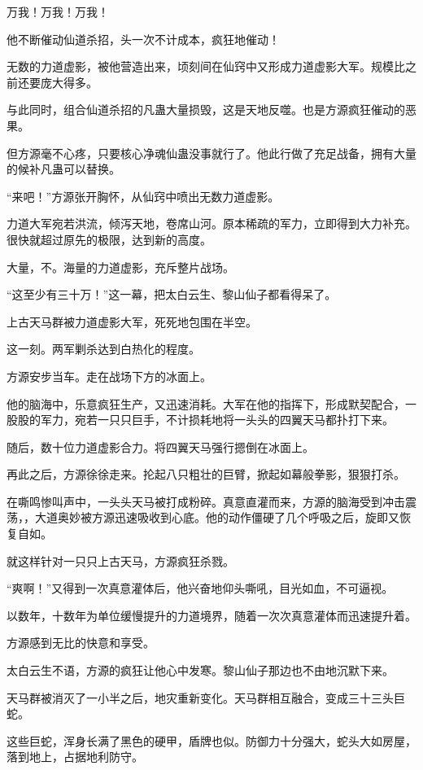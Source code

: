 \begin{this_body}
万我！万我！万我！

他不断催动仙道杀招，头一次不计成本，疯狂地催动！

无数的力道虚影，被他营造出来，顷刻间在仙窍中又形成力道虚影大军。规模比之前还要庞大得多。

与此同时，组合仙道杀招的凡蛊大量损毁，这是天地反噬。也是方源疯狂催动的恶果。

但方源毫不心疼，只要核心净魂仙蛊没事就行了。他此行做了充足战备，拥有大量的候补凡蛊可以替换。

“来吧！”方源张开胸怀，从仙窍中喷出无数力道虚影。

力道大军宛若洪流，倾泻天地，卷席山河。原本稀疏的军力，立即得到大力补充。很快就超过原先的极限，达到新的高度。

大量，不。海量的力道虚影，充斥整片战场。

“这至少有三十万！”这一幕，把太白云生、黎山仙子都看得呆了。

上古天马群被力道虚影大军，死死地包围在半空。

这一刻。两军剿杀达到白热化的程度。

方源安步当车。走在战场下方的冰面上。

他的脑海中，乐意疯狂生产，又迅速消耗。大军在他的指挥下，形成默契配合，一股股的军力，宛若一只只巨手，不计损耗地将一头头的四翼天马都扑打下来。

随后，数十位力道虚影合力。将四翼天马强行摁倒在冰面上。

再此之后，方源徐徐走来。抡起八只粗壮的巨臂，掀起如幕般拳影，狠狠打杀。

在嘶鸣惨叫声中，一头头天马被打成粉碎。真意直灌而来，方源的脑海受到冲击震荡，，大道奥妙被方源迅速吸收到心底。他的动作僵硬了几个呼吸之后，旋即又恢复自如。

就这样针对一只只上古天马，方源疯狂杀戮。

“爽啊！”又得到一次真意灌体后，他兴奋地仰头嘶吼，目光如血，不可逼视。

以数年，十数年为单位缓慢提升的力道境界，随着一次次真意灌体而迅速提升着。

方源感到无比的快意和享受。

太白云生不语，方源的疯狂让他心中发寒。黎山仙子那边也不由地沉默下来。

天马群被消灭了一小半之后，地灾重新变化。天马群相互融合，变成三十三头巨蛇。

这些巨蛇，浑身长满了黑色的硬甲，盾牌也似。防御力十分强大，蛇头大如房屋，落到地上，占据地利防守。


\end{this_body}
